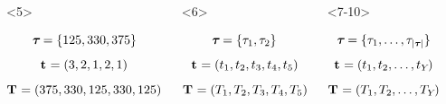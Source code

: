 \begin{frame}
\begin{columns}[c]
            \begin{onlyenv}<5>
            \begin{displaybox}[4.5cm]
                {\small
                \vspace{0.7mm}
                \[
                    \boldsymbol{\tau_{}} = \{125,330,375\}
                \]\vspace{0mm}
                }
                \[
                    \mathbf{t_{}} = (3,2,1,2,1)
                \]\vspace{0mm}
                {\small
                \[
                    \mathbf{T_{}} = (375,330,125,330,125)
                \]\vspace{0mm}
                }
            \end{displaybox}
            \end{onlyenv}
            \begin{onlyenv}<6>
            \begin{displaybox}[4.5cm]
                \[
                    \boldsymbol{\tau_{}} = \{\tau_{1},\tau_{2}\}
                \]\vspace{0mm}
                \[
                    \mathbf{t_{}} = (t_{1},t_{2},t_{3},t_{4},t_{5})
                \]\vspace{0mm}
                {\small
                \[
                    \mathbf{T_{}} = (T_{1},T_{2},T_{3},T_{4},T_{5})
                \]\vspace{0mm}
                }
            \end{displaybox}
            \end{onlyenv}
            \begin{onlyenv}<7-10>
            \begin{displaybox}[4.5cm]
                \[
                    \boldsymbol{\tau_{}} = \{\tau_{1},\ldots,\tau_{\lvert \boldsymbol{\tau_{}} \rvert}\}
                \]\vspace{0mm}
                \[
                    \mathbf{t_{}} = (t_{1},t_{2},\ldots,t_{Y_{}})
                \]\vspace{0mm}
                {\small
                \[
                    \mathbf{T_{}} = (T_{1},T_{2},\ldots,T_{Y_{}})
                \]\vspace{0mm}
                }
            \end{displaybox}

\end{onlyenv}
\end{columns}
\end{frame}
